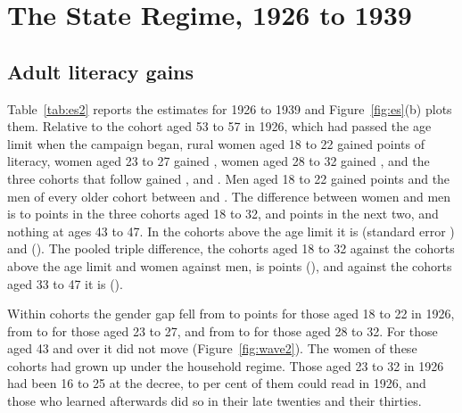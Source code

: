 \FloatBarrier
\section{The State Regime, 1926 to 1939}\label{sec:wave2}

\subsection{Adult literacy gains}\label{sec:gains2}

Table~\ref{tab:es2} reports the estimates for 1926 to 1939 and Figure~\ref{fig:es}(b) plots them. Relative to the cohort aged 53 to 57 in 1926, which had passed the age limit when the campaign began, rural women aged 18 to 22 gained  points of literacy, women aged 23 to 27 gained , women aged 28 to 32 gained , and the three cohorts that follow gained ,  and . Men aged 18 to 22 gained  points and the men of every older cohort between  and . The difference between women and men is  to  points in the three cohorts aged 18 to 32,  and  points in the next two, and nothing at ages 43 to 47. In the cohorts above the age limit it is  (standard error ) and  (). The pooled triple difference, the cohorts aged 18 to 32 against the cohorts above the age limit and women against men, is  points (), and against the cohorts aged 33 to 47 it is  ().

Within cohorts the gender gap fell from  to  points for those aged 18 to 22 in 1926, from  to  for those aged 23 to 27, and from  to  for those aged 28 to 32. For those aged 43 and over it did not move (Figure~\ref{fig:wave2}). The women of these cohorts had grown up under the household regime. Those aged 23 to 32 in 1926 had been 16 to 25 at the decree,  to  per cent of them could read in 1926, and those who learned afterwards did so in their late twenties and their thirties.

\begin{table}[htbp]\centering
\caption{State regime: literacy gain 1926 to 1939 by age in 1926 and sex, rural population}\label{tab:es2}
\begingroup\small
\fitwidth{}
\endgroup
\end{table}

